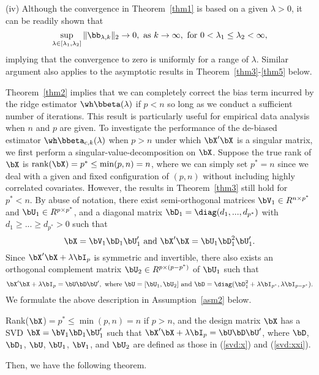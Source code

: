 \begin{remark}
(iv) Although the convergence in Theorem~\ref{thm1} is based on a given $\lambda>0$, it can be readily shown that 
\[\sup_{\lambda\in[\lambda_1,\lambda_2]}\|\bb_{\lambda,k}\|_2\rightarrow{0},\,\,\text{as}\,\, k\rightarrow\infty,\,\,\text{for}\,\,0<\lambda_1\leq \lambda_2<\infty,\]
implying that the convergence to zero is uniformly  for a range of $\lambda$. Similar argument also applies to the asymptotic results in Theorem~\ref{thm3}-\ref{thm5} below.
\end{remark}
Theorem~\ref{thm2} implies that we can  completely correct the bias term incurred by the ridge estimator $\wh\bbeta(\lambda)$ if $p<n$ so long as we conduct a sufficient number of iterations. This result is particularly useful for empirical data analysis when $n$ and $p$ are given.
To investigate the performance of the de-biased estimator $\wh\bbeta_{c,k}(\lambda)$ when $p>n$ under which $\bX'\bX$ is a singular matrix, we first perform a singular-value-decomposition on $\bX$. Suppose the true rank of $\bX$ is $\text{rank}(\bX)=p^*\leq  \min(p,n)=n$, where we can simply set $p^*=n$ since we deal with a given and fixed configuration of $(p,n)$ without including highly correlated covariates. However, the results in Theorem~\ref{thm3} still hold for $p^*<n$.
By abuse of notation, there exist semi-orthogonal matrices $\bV_1\in R^{n\times p^*}$ and $\bU_1\in R^{p\times p^*}$, and a diagonal matrix $\bD_1=\diag(d_1,...,d_{p^*})$ with $d_1\geq ...\geq d_{p^*}>0$ such that
\begin{equation}\label{svd:x}
\bX=\bV_1\bD_1\bU_1'\,\,\text{and}\,\,\bX'\bX=\bU_1\bD_1^2\bU_1'.
\end{equation}
Since $\bX'\bX+\lambda\bI_p$ is symmetric and invertible, there also exists an orthogonal complement matrix $\bU_2\in R^{p\times (p-p^*)}$ of $\bU_1$ such that
\begin{equation}\label{svd:xxi}
 \bX'\bX+\lambda\bI_p=\bU\bD\bU', \,\,\text{where}\,\, \bU=[\bU_1,\bU_2]\,\,\text{and}\,\,\bD=\diag(\bD_1^2+\lambda\bI_{p^*},\lambda\bI_{p-p^*}).
\end{equation}
We formulate the above description in Assumption~\ref{asm2} below.
\begin{assumption}\label{asm2}
    Rank($\bX$)$=p^*\leq \min(p,n)=n$ if $p>n$, and the design matrix $\bX$ has a SVD $\bX=\bV_1\bD_1\bU_1'$ such that  $\bX'\bX+\lambda\bI_p=\bU\bD\bU'$, where $\bD$, $\bD_1$, $\bU$, $\bU_1$,  $\bV_1$, and $\bU_2$ are defined as those in (\ref{svd:x}) and (\ref{svd:xxi}).
\end{assumption}
Then, we have the following theorem.
